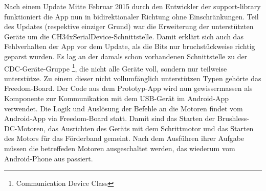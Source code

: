 Nach einem Update Mitte Februar 2015 durch den Entwickler der support-library funktioniert die App nun 
in bidirektionaler Richtung ohne Einschränkungen. Teil des Updates (respektive einziger Grund) war die 
Erweiterung der unterstützten Geräte um die CH34xSerialDevice-Schnittstelle. Damit erklärt sich auch das 
Fehlverhalten der  App vor dem Update, als die Bits nur bruchstückweise richtig geparst wurden. Es lag 
an der damals schon vorhandenen Schnittstelle zu der CDC-Geräte-Gruppe \footnote{Communication Device Class}, 
die nicht alle Geräte voll, sondern nur teilweise unterstütze. Zu einem dieser nicht vollumfänglich 
unterstützen Typen gehörte das Freedom-Board.
Der Code aus dem  Prototyp-App wird nun gewissermassen als Komponente zur Kommunikation mit dem USB-Gerät
im Android-App verwendet. 
\newline
\newline
Die Logik und Auslösung der Befehle an die Motoren findet vom Android-App via Freedom-Board statt. Damit 
sind das Starten der Brushless-DC-Motoren, das Ausrichten des Geräts mit dem Schrittmotor und das Starten 
des Motors für das Förderband gemeint. Nach dem Ausführen ihrer Aufgabe müssen die betreffeden Motoren 
ausgeschaltet werden, das wiederum vom Android-Phone aus passiert.
